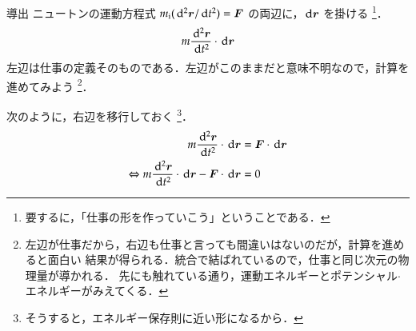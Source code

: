             \begin{mysmallsec}{導出}
                ニュートンの運動方程式 $m_{\rm{i}}(\,\mathrm{d}^{2}\boldsymbol{r}/\,\mathrm{d} t^{2}) = \boldsymbol{F}$
                の両辺に，$\,\mathrm{d}\boldsymbol{r}$ を掛ける
                    \footnote{
                        要するに，「仕事の形を作っていこう」ということである．
                    }．
                    \begin{align}\label{eq:energy_and_work}
                        m\frac{\df^{2}\br}{\df t^{2}}\cdot \df\br
                    \end{align}
                左辺は仕事の定義そのものである．左辺がこのままだと意味不明なので，計算を進めてみよう
                    \footnote{
                        左辺が仕事だから，右辺も仕事と言っても間違いはないのだが，計算を進めると面白い
                        結果が得られる．統合で結ばれているので，仕事と同じ次元の物理量が導かれる．
                        先にも触れている通り，運動エネルギーとポテンシャル$\cdot$エネルギーがみえてくる．
                    }．

                次のように，右辺を移行しておく
                    \footnote{
                        そうすると，エネルギー保存則に近い形になるから．
                    }．
                    \begin{align}
                        m\frac{\,\mathrm{d}^{2}\boldsymbol{r}}{\,\mathrm{d} t^{2}}\cdot \,\mathrm{d}\boldsymbol{r}
                         &= \boldsymbol{F}\cdot \,\mathrm{d}\boldsymbol{r} \notag \\
                        \Leftrightarrow m\frac{\,\mathrm{d}^{2}\boldsymbol{r}}{\,\mathrm{d} t^{2}}\cdot \,\mathrm{d}\boldsymbol{r}
                        -\boldsymbol{F}\cdot \,\mathrm{d}\boldsymbol{r} &= 0
                    \end{align}


\end{mysmallsec}
